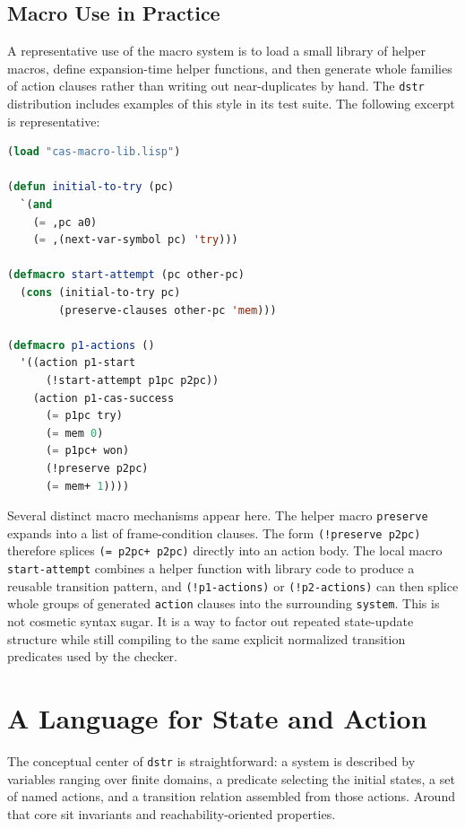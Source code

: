 \documentclass[11pt]{article}
\begin{document}
\subsection{Macro Use in Practice}

A representative use of the macro system is to load a small library of helper
macros, define expansion-time helper functions, and then generate whole
families of action clauses rather than writing out near-duplicates by hand. The
\texttt{dstr} distribution includes examples of this style in its test suite.
The following excerpt is representative:

\begin{lstlisting}[language=Lisp]
(load "cas-macro-lib.lisp")

(defun initial-to-try (pc)
  `(and
    (= ,pc a0)
    (= ,(next-var-symbol pc) 'try)))

(defmacro start-attempt (pc other-pc)
  (cons (initial-to-try pc)
        (preserve-clauses other-pc 'mem)))

(defmacro p1-actions ()
  '((action p1-start
      (!start-attempt p1pc p2pc))
    (action p1-cas-success
      (= p1pc try)
      (= mem 0)
      (= p1pc+ won)
      (!preserve p2pc)
      (= mem+ 1))))
\end{lstlisting}

Several distinct macro mechanisms appear here. The helper macro
\texttt{preserve} expands into a list of frame-condition clauses. The form
\texttt{(!preserve p2pc)} therefore splices \texttt{(= p2pc+ p2pc)} directly
into an action body. The local macro \texttt{start-attempt} combines a helper
function with library code to produce a reusable transition pattern, and
\texttt{(!p1-actions)} or \texttt{(!p2-actions)} can then splice whole groups
of generated \texttt{action} clauses into the surrounding \texttt{system}. This
is not cosmetic syntax sugar. It is a way to factor out repeated state-update
structure while still compiling to the same explicit normalized transition
predicates used by the checker.

\section{A Language for State and Action}

The conceptual center of \texttt{dstr} is straightforward: a system is described by
variables ranging over finite domains, a predicate selecting the initial
states, a set of named actions, and a transition relation assembled from those
actions. Around that core sit invariants and reachability-oriented properties.
\end{document}
